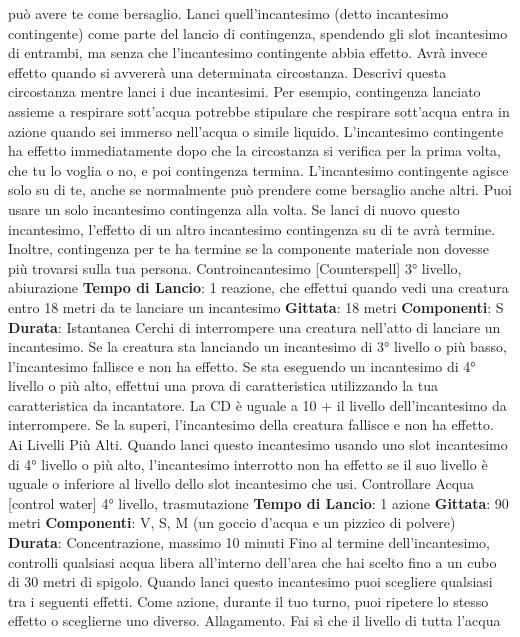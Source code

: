 \begin{multicols}{2}
può avere te come bersaglio. Lanci quell’incantesimo
(detto incantesimo contingente) come parte del lancio di
contingenza, spendendo gli slot incantesimo di
entrambi, ma senza che l’incantesimo contingente
abbia effetto. Avrà invece effetto quando si avvererà
una determinata circostanza. Descrivi questa
circostanza mentre lanci i due incantesimi. Per
esempio, contingenza lanciato assieme a respirare
sott’acqua potrebbe stipulare che respirare sott’acqua
entra in azione quando sei immerso nell’acqua o simile
liquido.
L’incantesimo contingente ha effetto immediatamente
dopo che la circostanza si verifica per la prima volta,
che tu lo voglia o no, e poi contingenza termina.
L’incantesimo contingente agisce solo su di te, anche
se normalmente può prendere come bersaglio anche
altri. Puoi usare un solo incantesimo contingenza alla
volta. Se lanci di nuovo questo incantesimo, l’effetto di
un altro incantesimo contingenza su di te avrà termine.
Inoltre, contingenza per te ha termine se la componente
materiale non dovesse più trovarsi sulla tua persona.
Controincantesimo
[Counterspell]
3° livello, abiurazione
\textbf{Tempo di Lancio}: 1 reazione, che effettui quando vedi
una creatura entro 18 metri da te lanciare un
incantesimo
\textbf{Gittata}: 18 metri
\textbf{Componenti}: S
\textbf{Durata}: Istantanea
Cerchi di interrompere una creatura nell’atto di lanciare
un incantesimo. Se la creatura sta lanciando un
incantesimo di 3° livello o più basso, l’incantesimo
fallisce e non ha effetto. Se sta eseguendo un
incantesimo di 4° livello o più alto, effettui una prova di
caratteristica utilizzando la tua caratteristica da
incantatore. La CD è uguale a 10 + il livello
dell’incantesimo da interrompere. Se la superi,
l’incantesimo della creatura fallisce e non ha effetto.
Ai Livelli Più Alti. Quando lanci questo incantesimo
usando uno slot incantesimo di 4° livello o più alto,
l’incantesimo interrotto non ha effetto se il suo livello è
uguale o inferiore al livello dello slot incantesimo che
usi.
Controllare Acqua
[control water]
4° livello, trasmutazione
\textbf{Tempo di Lancio}: 1 azione
\textbf{Gittata}: 90 metri
\textbf{Componenti}: V, S, M (un goccio d’acqua e un pizzico
di polvere)
\textbf{Durata}: Concentrazione, massimo 10 minuti
Fino al termine dell’incantesimo, controlli qualsiasi
acqua libera all’interno dell’area che hai scelto fino a un
cubo di 30 metri di spigolo. Quando lanci questo
incantesimo puoi scegliere qualsiasi tra i seguenti
effetti. Come azione, durante il tuo turno, puoi ripetere
lo stesso effetto o sceglierne uno diverso.
Allagamento. Fai sì che il livello di tutta l’acqua

\end{multicols}
